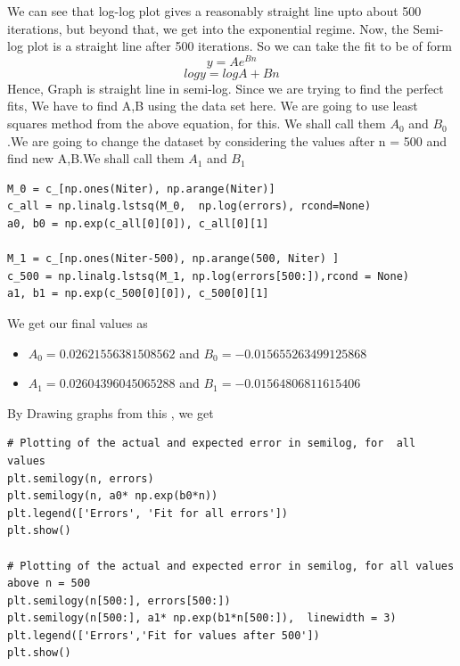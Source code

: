 \documentclass[12pt, a4paper]{report}
\begin{document}
 We can see that log-log plot gives a reasonably straight line upto about 500 iterations, but beyond that, we get into the exponential regime. Now, the Semi-log plot is a straight line after 500 iterations. So we can take the fit to be of form
\begin{equation}
y = Ae^{Bn}
\end{equation}
\begin{equation}
logy = logA + Bn
\end{equation}
Hence, Graph is straight line in semi-log. Since we are trying to find the perfect fits, We have to find A,B using the data set here. We are going to use least squares method from the above equation, for this. We shall call them $A_0$ and $B_0$.We are going to change the dataset by considering the values after n = 500  and find new A,B.We shall call them $A_1$ and $B_1$
\begin{Verbatim}
M_0 = c_[np.ones(Niter), np.arange(Niter)]
c_all = np.linalg.lstsq(M_0,  np.log(errors), rcond=None)
a0, b0 = np.exp(c_all[0][0]), c_all[0][1]

M_1 = c_[np.ones(Niter-500), np.arange(500, Niter) ]
c_500 = np.linalg.lstsq(M_1, np.log(errors[500:]),rcond = None)
a1, b1 = np.exp(c_500[0][0]), c_500[0][1]
\end{Verbatim}

We get our final values as
\begin{itemize}
	\item $A_0 = 0.02621556381508562 $ and $B_0 = -0.015655263499125868$ 
	\item $A_1 = 0.02604396045065288 $ and $B_1 = -0.01564806811615406 $
\end{itemize}

By Drawing graphs from this , we get 
\begin{Verbatim}
# Plotting of the actual and expected error in semilog, for  all values
plt.semilogy(n, errors)
plt.semilogy(n, a0* np.exp(b0*n))
plt.legend(['Errors', 'Fit for all errors'])
plt.show()

# Plotting of the actual and expected error in semilog, for all values above n = 500
plt.semilogy(n[500:], errors[500:])
plt.semilogy(n[500:], a1* np.exp(b1*n[500:]),  linewidth = 3)
plt.legend(['Errors','Fit for values after 500'])
plt.show()
\end{Verbatim}
\end{document}
